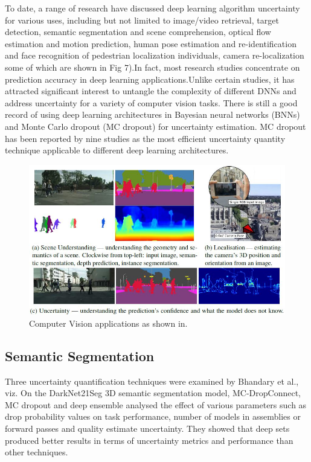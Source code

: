 \documentclass[journal]{IEEEtran}
\begin{document}
To date, a range of research have discussed deep learning algorithm uncertainty for various uses, including but not limited to image/video retrieval, target detection,
semantic segmentation and scene comprehension, optical flow estimation and motion prediction, human pose estimation and re-identification and face recognition of pedestrian localization individuals, camera re-localization\cite{kwon2020uncertainty} some of which are shown in Fig 7).In fact, most research studies concentrate
on prediction accuracy in deep learning applications.Unlike certain studies, it has attracted significant interest to untangle the complexity
of different DNNs and address uncertainty for a variety of computer vision tasks\cite{kwon2020uncertainty}.
There is still a good record of using deep learning architectures in
Bayesian neural networks (BNNs) and Monte Carlo dropout (MC dropout) for uncertainty estimation.
MC dropout has been reported by nine studies as the
most efficient uncertainty quantity technique applicable to different deep learning architectures. 

\begin{figure}
  \centering
  \includegraphics{figures/application.JPG}
  \caption{Computer Vision applications as shown in\cite{kendall2019geometry}.}
\end{figure}

\subsection{Semantic Segmentation}

Three uncertainty quantification techniques were
examined by Bhandary et al., viz.
On the DarkNet21Seg 3D semantic segmentation model, MC-DropConnect, MC dropout and deep ensemble analysed the effect of various parameters
such as drop probability values on task performance, number of models in assemblies or forward passes and quality estimate uncertainty.
They showed that deep sets produced better results in
terms of uncertainty metrics and performance than other techniques\cite{dewan2017deep}. 
\end{document}
